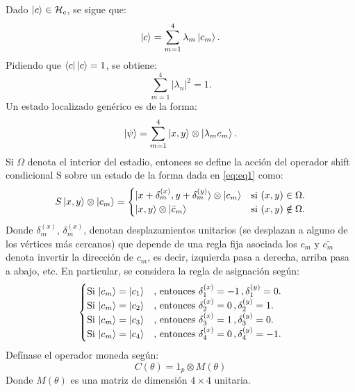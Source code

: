 \documentclass[12pt,a4paper]{article}
\begin{document}
Dado $\ket{c}\in \mathcal{H}_c$, se sigue que:
\begin{equation*}
    \ket{c}=\sum_{m=1}^{4}\lambda_m \ket{c_m}.
\end{equation*}
Pidiendo que $\bra{c}\ket{c}=1$, se obtiene:
\begin{equation*}
    \sum_{m=1}^{4}|\lambda_n|^2=1.
\end{equation*}
Un estado localizado genérico es de la forma:
\begin{equation}
    \ket{\psi}=\sum_{m=1}^{4}\ket{x,y}\otimes\ket{\lambda_m c_m}.
    \label{eq:eq1}
\end{equation}
Si $\Omega$ denota el interior del estadio, entonces se define la acción del operador shift condicional S sobre un estado de la forma dada en \eqref{eq:eq1} como:
\begin{equation}
   S\ket{x,y}\otimes \ket{c_m}=
   \begin{cases}
        \ket{x+\delta_m^{(x)},y+\delta_m^{(y)}}\otimes \ket{c_m} & \text{si $(x,y)\in \Omega$}.
        \\
        \ket{x,y}\otimes \ket{\bar{c}_m} & \text{si $(x,y)\notin \Omega$}.
    \end{cases}
\end{equation}
Donde $\delta_m^{(x)}$, $\delta_m^{(x)}$, denotan desplazamientos unitarios (se desplazan a alguno de los vértices más cercanos) que depende de una regla fija asociada los $c_m$
y $\bar{c_m}$ denota invertir la dirección de $c_m$, es decir, izquierda pasa a derecha, arriba pasa a abajo, etc.
En particular, se considera la regla de asignación según:
\begin{equation*}
\begin{cases}
    \text{Si $\ket{c_m}=\ket{c_1}$} & \text{, entonces }\delta_1^{(x)}=-1\,,\delta_1^{(y)}=0. \\
     \text{Si $\ket{c_m}=\ket{c_2}$} & \text{, entonces }\delta_2^{(x)}=0\,,\delta_2^{(y)}=1. \\
      \text{Si $\ket{c_m}=\ket{c_3}$} & \text{, entonces }\delta_3^{(x)}=1\,,\delta_3^{(y)}=0. \\
       \text{Si $\ket{c_m}=\ket{c_4}$} & \text{, entonces }\delta_4^{(x)}=0\,,\delta_4^{(y)}=-1. \\
\end{cases}
\end{equation*}
Defínase el operador moneda según:
\begin{equation}
   C(\theta)= 1_p\otimes M(\theta)
\end{equation}
Donde $M(\theta)$ es una matriz de dimensión $4\times 4$ unitaria.
\end{document}
